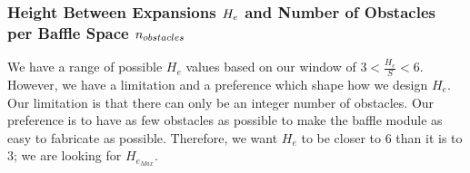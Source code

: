 \documentclass[letterpaper,10pt,english]{sphinxmanual}
\begin{document}
\subsubsection{Height Between Expansions \protect\(H_e\protect\) and Number of Obstacles per Baffle Space \protect\(n_{obstacles}\protect\)}
\label{\detokenize{Flocculation/Floc_Design:height-between-expansions-and-number-of-obstacles-per-baffle-space}}
We have a range of possible \(H_e\) values based on our window of \(3 < \frac{H_e}{S} < 6\). However, we have a limitation and a preference which shape how we design \(H_e\). Our limitation is that there can only be an integer number of obstacles. Our preference is to have as few obstacles as possible to make the baffle module as easy to fabricate as possible. Therefore, we want \(H_e\) to be closer to \(6\) than it is to \(3\); we are looking for \(H_{e_{Max}}\).
\end{document}
